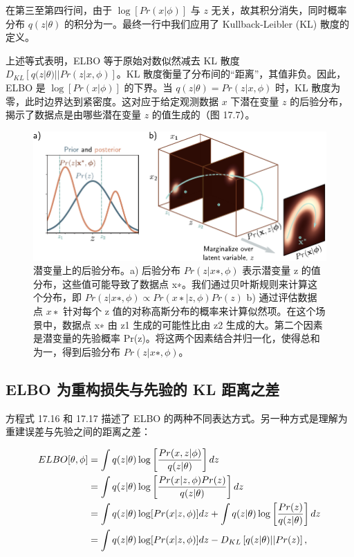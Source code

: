 \documentclass[lang=cn,newtx,10pt,scheme=chinese]{elegantbook}
\begin{document}
在第三至第四行间，由于 \(\log[Pr(x|\phi)]\) 与 \(z\) 无关，故其积分消失，同时概率分布 \(q(z|\theta)\) 的积分为一。最终一行中我们应用了 Kullback-Leibler (KL) 散度的定义。

上述等式表明，ELBO 等于原始对数似然减去 KL 散度 \(D_{KL} [ q(z|\theta) || Pr(z|x, \phi) ]\)。KL 散度衡量了分布间的“距离”，其值非负。因此，ELBO 是 \(\log[Pr(x|\phi)]\) 的下界。当 \(q(z|\theta) = Pr(z|x, \phi)\) 时，KL 散度为零，此时边界达到紧密度。这对应于给定观测数据 \(x\) 下潜在变量 \(z\) 的后验分布，揭示了数据点是由哪些潜在变量 \(z\) 的值生成的（图 17.7）。

\begin{figure}[ht!]
\centering
\includegraphics[width=0.7\linewidth]{PDFFigures/UDLChap17PDF/VAENonLinearLVMPost2.pdf}
\caption{潜变量上的后验分布。a) 后验分布 \(Pr(z|x∗, \phi)\) 表示潜变量 z 的值分布，这些值可能导致了数据点 x∗。我们通过贝叶斯规则来计算这个分布，即 \(Pr(z|x∗, \phi) \propto Pr(x∗|z, \phi)Pr(z)\) b) 通过评估数据点 \(x∗\) 针对每个 z 值的对称高斯分布的概率来计算似然项。在这个场景中，数据点 x∗ 由 z1 生成的可能性比由 z2 生成的大。第二个因素是潜变量的先验概率 Pr(z)。将这两个因素结合并归一化，使得总和为一，得到后验分布 \(Pr(z|x∗, \phi)\)。}
\end{figure}


\subsection{ELBO 为重构损失与先验的 KL 距离之差}
方程式 17.16 和 17.17 描述了 ELBO 的两种不同表达方式。另一种方式是理解为重建误差与先验之间的距离之差：


\begin{align}
ELBO[\theta, \phi] &= \int q(z|\theta) \log \left[ \frac{Pr(x, z|\phi)}{q(z|\theta)} \right] dz \notag \\
&= \int q(z|\theta) \log \left[ \frac{Pr(x|z, \phi)Pr(z)}{q(z|\theta)} \right] dz \notag \\
&= \int q(z|\theta) \log [Pr(x|z, \phi)] dz + \int q(z|\theta) \log \left[ \frac{Pr(z)}{q(z|\theta)} \right] dz \notag \\
&= \int q(z|\theta) \log [Pr(x|z, \phi)] dz - D_{KL} \left[ q(z|\theta) || Pr(z) \right], 
\end{align} 
\end{document}
